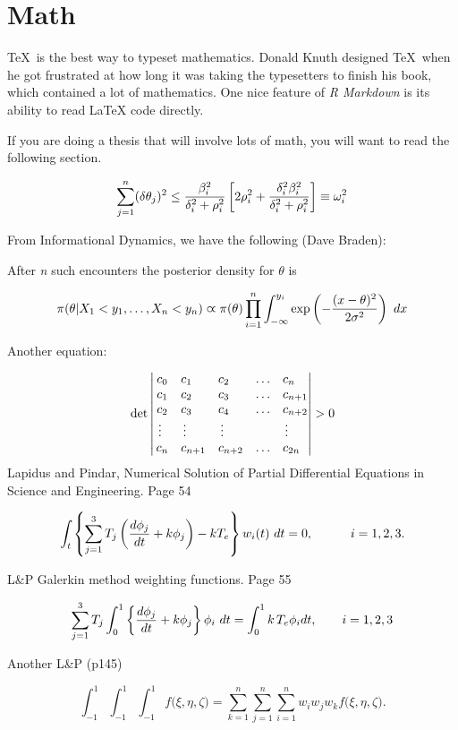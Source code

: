 \documentclass[12pt,twoside]{dukestatscithesis}
\theoremstyle{definition}
\theoremstyle{definition}
\theoremstyle{definition}
\theoremstyle{remark}
\begin{document}
\hypertarget{math}{\section{Math}\label{math}}

\TeX~is the best way to typeset mathematics. Donald Knuth designed
\TeX~when he got frustrated at how long it was taking the typesetters to
finish his book, which contained a lot of mathematics. One nice feature
of \emph{R Markdown} is its ability to read LaTeX code directly.

If you are doing a thesis that will involve lots of math, you will want
to read the following section.

\[\sum_{j=1}^n (\delta\theta_j)^2 \leq {{\beta_i^2}\over{\delta_i^2 + \rho_i^2}}
\left[ 2\rho_i^2 + {\delta_i^2\beta_i^2\over{\delta_i^2 + \rho_i^2}} \right] \equiv \omega_i^2
\]

From Informational Dynamics, we have the following (Dave Braden):

After \emph{n} such encounters the posterior density for \(\theta\) is

\[
\pi(\theta|X_1< y_1,\dots,X_n<y_n) \varpropto \pi(\theta) \prod_{i=1}^n\int_{-\infty}^{y_i}
   \exp\left(-{(x-\theta)^2\over{2\sigma^2}}\right)\ dx
\]

Another equation:

\[\det\left|\,\begin{matrix}%
c_0&c_1\hfill&c_2\hfill&\ldots&c_n\hfill\cr
c_1&c_2\hfill&c_3\hfill&\ldots&c_{n+1}\hfill\cr
c_2&c_3\hfill&c_4\hfill&\ldots&c_{n+2}\hfill\cr
\,\vdots\hfill&\,\vdots\hfill&
  \,\vdots\hfill&&\,\vdots\hfill\cr
c_n&c_{n+1}\hfill&c_{n+2}\hfill&\ldots&c_{2n}\hfill\cr
\end{matrix}\right|>0\]
Lapidus and Pindar, Numerical Solution of Partial Differential Equations
in Science and Engineering. Page 54

\[
\int_t\left\{\sum_{j=1}^3 T_j \left({d\phi_j\over dt}+k\phi_j\right)-kT_e\right\}w_i(t)\ dt=0,
   \qquad\quad i=1,2,3.
\]

L\&P Galerkin method weighting functions. Page 55

\[
\sum_{j=1}^3 T_j\int_0^1\left\{{d\phi_j\over dt} + k\phi_j\right\} \phi_i\ dt
   = \int_{0}^1k\,T_e\phi_idt, \qquad i=1,2,3 \]

Another L\&P (p145)

\[
\int_{-1}^1\!\int_{-1}^1\!\int_{-1}^1 f\big(\xi,\eta,\zeta\big)
   = \sum_{k=1}^n\sum_{j=1}^n\sum_{i=1}^n w_i w_j w_k f\big( \xi,\eta,\zeta\big).
\]
\end{document}
